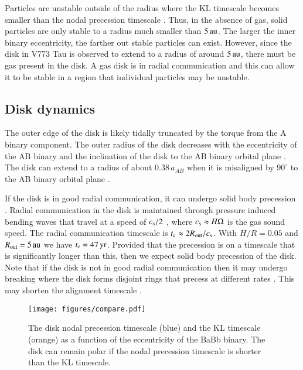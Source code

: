 \documentclass{aa}
\begin{document}
Particles are unstable outside of the radius where the KL timescale becomes smaller than the nodal precession timescale \citep{Verrier2009,Martin2022}.
%
Thus, in the absence of gas, solid particles are only stable to a  radius much smaller than $5\,\rm au$.
%
The larger the inner binary eccentricity, the farther out stable particles can exist.
%
However, since the disk in V773 Tau is observed to extend to a radius of around $5\,\rm au$, there must be gas present in the disk.
%
A gas disk is in radial communication and this can allow it to be stable in a region that individual particles may be unstable.

\subsection{Disk dynamics}

The outer edge of the disk is likely tidally truncated by the torque from the A binary component.
%
The outer radius of the disk decreases with the eccentricity of the AB binary \citep{Artymowicz1994} and the inclination of the disk to the AB binary orbital plane \citep{Lubow2015}.
%
The disk can extend to a radius of about $0.38\,a_{AB}$ when it is misaligned by $90^\circ$ to the AB binary orbital plane \citep{Miranda2015}.

If the disk is in good radial communication, it can undergo solid body precession  \citep{Larwood1996}.
%
Radial communication in the disk is maintained through pressure induced bending waves that travel at a speed of $c_{\rm s}/2$ \citep{PapaloizouLin1995,Lubow2002}, where $c_{\rm s}\approx H\Omega$ is the gas sound speed.
%
The radial communication timescale is $t_{\rm c}\approx 2 R_{\rm out}/c_{\rm s}$.
%
With $H/R=0.05$ and $R_{\rm out}=5\,\rm au$ we have $t_{\rm c}=47\,\rm yr$.
%
Provided that the precession is on a timescale that is significantly longer than this, then we expect solid body precession of the disk.
%
Note that if the disk is not in good radial communication then it may undergo breaking where the disk forms disjoint rings that precess at different rates \citep[e.g.][]{Larwood1996,Nixon2013}.
%
This may shorten the alignment timescale \citep[e.g.][]{Smallwood2020}.


\begin{figure}
\begin{center}
    \centering
    \texttt{[image: figures/compare.pdf]}
    \caption{The disk nodal precession timescale (blue) and the KL timescale (orange) as a function of the eccentricity of the BaBb binary.
    The disk can remain polar if the nodal precession timescale is shorter than the KL timescale.  }
\label{fig:timescales}
\end{center}
\end{figure} 
\end{document}
